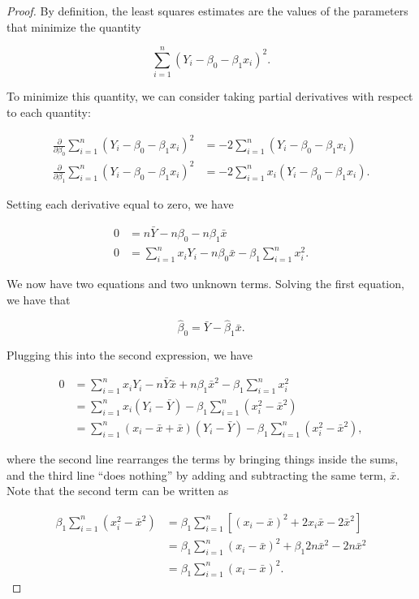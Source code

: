 \documentclass[
  letterpaper,
  DIV=11,
  numbers=noendperiod]{scrreprt}
\theoremstyle{definition}
\theoremstyle{plain}
\theoremstyle{definition}
\theoremstyle{remark}
\begin{document}
\begin{proof}
By definition, the least squares estimates are the values of the
parameters that minimize the quantity

\[\sum_{i=1}^{n} \left(Y_i - \beta_0 - \beta_1 x_i\right)^2.\]

To minimize this quantity, we can consider taking partial derivatives
with respect to each quantity:

\[
\begin{aligned}
  \frac{\partial}{\partial \beta_0} \sum_{i=1}^{n} \left(Y_i - \beta_0 - \beta_1 x_i\right)^2
    &= -2 \sum_{i=1}^{n} \left(Y_i - \beta_0 - \beta_1 x_i\right) \\
  \frac{\partial}{\partial \beta_1} \sum_{i=1}^{n} \left(Y_i - \beta_0 - \beta_1 x_i\right)^2
    &= -2 \sum_{i=1}^{n} x_i \left(Y_i - \beta_0 - \beta_1 x_i\right).
\end{aligned}
\]

Setting each derivative equal to zero, we have

\[
\begin{aligned}
  0 
    &= n\bar{Y} - n\beta_0 - n\beta_1 \bar{x} \\
  0
    &= \sum_{i=1}^{n} x_i Y_i - n\beta_0 \bar{x} - \beta_1 \sum_{i=1}^{n} x_i^2. 
\end{aligned}
\]

We now have two equations and two unknown terms. Solving the first
equation, we have that

\[\widehat{\beta}_0 = \bar{Y} - \widehat{\beta}_1 \bar{x}.\]

Plugging this into the second expression, we have

\[
\begin{aligned}
  0 
    &= \sum_{i=1}^{n} x_i Y_i - n\bar{Y}\bar{x} + n \beta_1 \bar{x}^2 - \beta_1 \sum_{i=1}^{n} x_i^2 \\
    &= \sum_{i=1}^{n} x_i \left(Y_i - \bar{Y}\right) - \beta_1 \sum_{i=1}^{n} \left(x_i^2 - \bar{x}^2\right) \\
    &= \sum_{i=1}^{n} \left(x_i - \bar{x} + \bar{x}\right) \left(Y_i - \bar{Y}\right) - \beta_1 \sum_{i=1}^{n} \left(x_i^2 - \bar{x}^2\right),
\end{aligned}
\]

where the second line rearranges the terms by bringing things inside the
sums, and the third line ``does nothing'' by adding and subtracting the
same term, \(\bar{x}\). Note that the second term can be written as

\[
\begin{aligned}
  \beta_1 \sum_{i=1}^{n} \left(x_i^2 - \bar{x}^2\right)
    &= \beta_1 \sum_{i=1}^{n} \left[\left(x_i - \bar{x}\right)^2 + 2x_i\bar{x} - 2\bar{x}^2\right] \\
    &= \beta_1\sum_{i=1}^{n}\left(x_i - \bar{x}\right)^2 + \beta_1 2 n\bar{x}^2 - 2n\bar{x}^2 \\
    &= \beta_1 \sum_{i=1}^{n} \left(x_i - \bar{x}\right)^2.
\end{aligned}
\]


\end{proof}
\end{document}
